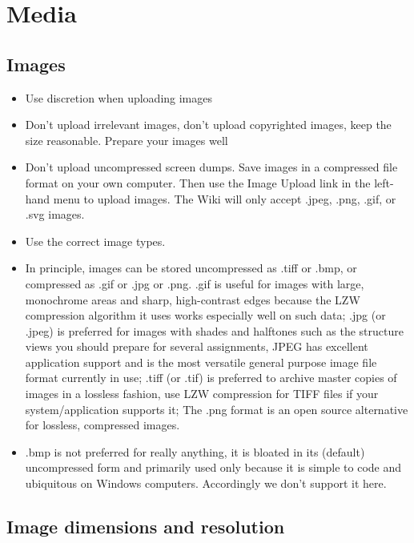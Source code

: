 \documentclass[]{book}
\providecommand{\tightlist}{%
  \setlength{\itemsep}{0pt}\setlength{\parskip}{0pt}}
\begin{document}
\section{Media}\label{media}

\subsection{Images}\label{images}

\begin{itemize}
\tightlist
\item
  Use discretion when uploading images
\item
  Don't upload irrelevant images, don't upload copyrighted images, keep
  the size reasonable. Prepare your images well
\item
  Don't upload uncompressed screen dumps. Save images in a compressed
  file format on your own computer. Then use the Image Upload link in
  the left-hand menu to upload images. The Wiki will only accept .jpeg,
  .png, .gif, or .svg images.
\item
  Use the correct image types.
\item
  In principle, images can be stored uncompressed as .tiff or .bmp, or
  compressed as .gif or .jpg or .png. .gif is useful for images with
  large, monochrome areas and sharp, high-contrast edges because the LZW
  compression algorithm it uses works especially well on such data; .jpg
  (or .jpeg) is preferred for images with shades and halftones such as
  the structure views you should prepare for several assignments, JPEG
  has excellent application support and is the most versatile general
  purpose image file format currently in use; .tiff (or .tif) is
  preferred to archive master copies of images in a lossless fashion,
  use LZW compression for TIFF files if your system/application supports
  it; The .png format is an open source alternative for lossless,
  compressed images.
\item
  .bmp is not preferred for really anything, it is bloated in its
  (default) uncompressed form and primarily used only because it is
  simple to code and ubiquitous on Windows computers. Accordingly we
  don't support it here.
\end{itemize}

\subsection{Image dimensions and
resolution}\label{image-dimensions-and-resolution}
\end{document}
